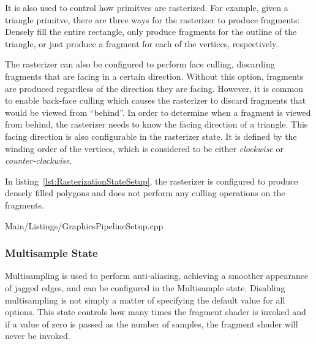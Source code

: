         It is also used to control how primitves are rasterized.
        For example, given a triangle primitve, there are three ways for the rasterizer to produce fragments: Densely fill the entire rectangle, only produce fragments for the outline of the triangle, or just produce a fragment for each of the vertices, respectively.

        The rasterizer can also be configured to perform face culling, discarding fragments that are facing in a certain direction.
        Without this option, fragments are produced regardless of the direction they are facing.
        However, it is common to enable back-face culling which causes the rasterizer to discard fragments that would be viewed from ``behind''.
        In order to determine when a fragment is viewed from behind, the rasterizer needs to know the facing direction of a triangle.
        This facing direction is also configurable in the rasterizer state.
        It is defined by the winding order of the vertices, which is considered to be either \textit{clockwise} or \textit{counter-clockwise}.


        In listing~\ref{lst:RasterizationStateSetup}, the rasterizer is configured to produce densely filled polygons and does not perform any culling operations on the fragments.

        
        {Main/Listings/GraphicsPipelineSetup.cpp}

      \subsubsection{Multisample State}
      \label{sss:MultisampleState}
        Multisampling is used to perform anti-aliasing, achieving a smoother appearance of jagged edges, and can be configured in the Multisample state.
        Disabling multisampling is not simply a matter of specifying the default value for all options.
        This state controls how many times the fragment shader is invoked and if a value of zero is passed as the number of samples, the fragment shader will never be invoked.

